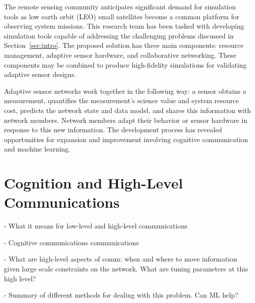 \documentclass[conference]{IEEEtran}
\begin{document}
The remote sensing community anticipates significant demand for simulation tools
as low earth orbit (LEO) small satellites become a common platform for observing
system missions.  This research team has been tasked with developing simulation
tools capable of addressing the challenging problems discussed in
Section~\ref{sec:intro}.  The proposed solution has three main components:
resource management, adaptive sensor hardware, and collaborative networking.
These components may be combined to produce high-fidelity simulations for
validating adaptive sensor designs.

Adaptive sensor networks work together in the following way: a sensor obtains a
measurement, quantifies the measurement's science value and system resource
cost, predicts the network state and data model, and shares this information
with network members.  Network members adapt their behavior or sensor hardware
in response to this new information.  The development process has revealed
opportunities for expansion and improvement involving cognitive communication
and machine learning.




\section{Cognition and High-Level Communications}
\label{sec:hlc}

%


{\color{red}
  - What it means for low-level and high-level communications

  - Cognitive communications communications

  - What are high-level aspects of comm: when and where to move information
  given large scale constraints on the network. What are tuning parameters at
  this high level?

  - Summary of different methods for dealing with this problem. Can ML help?
}
\end{document}
